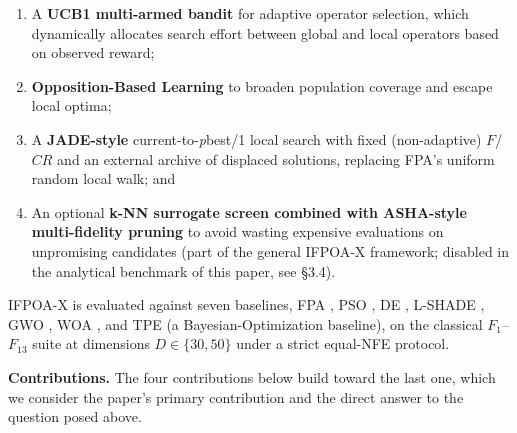 \documentclass[preprint,12pt]{elsarticle}
\begin{document}
\begin{enumerate}
\item A \textbf{UCB1 multi-armed bandit} \cite{auer2002finite} for adaptive operator selection, which dynamically allocates search effort between global and local operators based on observed reward;
\item \textbf{Opposition-Based Learning} \cite{tizhoosh2005opposition} to broaden population coverage and escape local optima;
\item A \textbf{JADE-style} \cite{zhang2009jade} current-to-\emph{p}best/1 local search with fixed (non-adaptive) $F$/$CR$ and an external archive of displaced solutions, replacing FPA's uniform random local walk; and
\item An optional \textbf{k-NN surrogate screen combined with ASHA-style multi-fidelity pruning} \cite{li2018hyperband,li2020asha} to avoid wasting expensive evaluations on unpromising candidates (part of the general IFPOA-X framework; disabled in the analytical benchmark of this paper, see \S3.4).
\end{enumerate}

IFPOA-X is evaluated against seven baselines, FPA \cite{yang2012flower}, PSO \cite{kennedy1995particle}, DE \cite{storn1997differential}, L-SHADE \cite{tanabe2014improving}, GWO \cite{mirjalili2014grey}, WOA \cite{mirjalili2016whale}, and TPE \cite{bergstra2013hyperopt} (a Bayesian-Optimization baseline), on the classical $F_1$--$F_{13}$ suite \cite{yao1999evolutionary} at dimensions $D \in \{30, 50\}$ under a strict equal-NFE protocol.

\textbf{Contributions.} The four contributions below build toward the last one, which we consider the paper's primary contribution and the direct answer to the question posed above.
\end{document}
